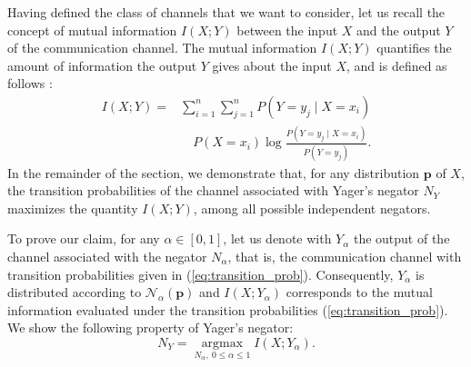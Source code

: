 \documentclass[pdflatex,sn-basic,iicol]{sn-jnl}%
\theoremstyle{thmstyleone}%
\theoremstyle{thmstyletwo}%
\theoremstyle{thmstylethree}%
\DeclareMathOperator*{\argmax}{\arg\max}
\newcommand{\N}{\mathcal{N}}
\newcommand{\bp}{\mathbf{p}}
\begin{document}
Having defined the class of channels that we want to consider, let us recall the concept of mutual information $I(X;Y)$ between the input $X$ and the output $Y$ of the communication channel. The mutual information $I(X;Y)$ quantifies the amount of information the output $Y$ gives about the input $X$, and is defined as follows \citep{CT}:
\begin{align}
    I(X;Y) = &\sum_{i=1}^n \sum_{j=1}^n P(Y=y_j\mid X=x_i)\nonumber\\&\quad P(X=x_i)\log \frac{P(Y=y_j\mid X=x_i)}{P(Y=y_j)}.\label{eq:mutual_information}
\end{align}
In the remainder of the section, we demonstrate that, for any 
distribution $\bp$ of $X$, the transition probabilities of the channel associated with Yager's negator $N_Y$ maximizes the quantity $I(X;Y)$, among all possible independent negators.

To prove our claim, for any $\alpha\in[0,1]$, let us denote with 
$Y_\alpha$ the output of the channel associated with the negator $N_\alpha$,
that is, the communication channel with transition probabilities given in (\ref{eq:transition_prob}). Consequently, $Y_\alpha$ is distributed according to $\N_\alpha(\bp)$ and $I(X;Y_{\alpha})$ corresponds to the mutual information evaluated under the transition probabilities (\ref{eq:transition_prob}).
We show the following property of  Yager's negator:%
\begin{equation}\label{eq:prob_I(X;Y)}
    N_Y = \underset{N_\alpha,\:  0\leq\alpha\leq 1}{\argmax} I(X; Y_\alpha).
\end{equation}
\end{document}

